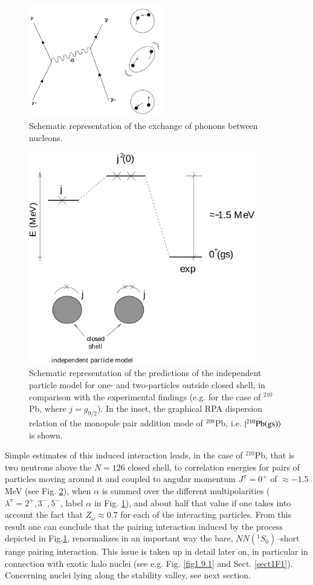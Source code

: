 \begin{figure}
\centerline {
\includegraphics*[width=6cm]{introduccion/figs/figintroD9}
}
\caption{Schematic representation of the exchange of phonons between nucleons.}
\label{fig:4.9}
\end{figure}
\begin{figure}
\centerline {
\includegraphics*[width=10cm]{introduccion/figs/figintroD10}
}
\caption{Schematic representation of the predictions of the independent particle model for one- and two-particles outside closed shell, in comparison with the experimental findings (e.g. for the case of $^{210}$Pb, where $j=g_{9/2}$). In the inset, the graphical RPA dispersion relation of the monopole pair addition mode of $^{208}$Pb, i.e. $|{^{210}\text{Pb(gs)}} \rangle$ is shown.}
\label{fig:4.10}
\end{figure}
Simple estimates of this induced interaction leads, in the case of $^{210}$Pb, that is two neutrons above the $N=126$ closed shell, to correlation energies  for pairs of particles moving around it and coupled to angular momentum $J^{\pi} = 0^+$ of $\approx -1.5$ MeV (see Fig. \ref{fig:4.10}), when $\alpha$ is summed over  the different multipolarities  ($\lambda^{\pi}=2^+,3^-,5^-$, label $\alpha$ in Fig. \ref{fig:4.9}), and about half that value if one takes into account the fact that $Z_\omega\approx0.7$ for each of the interacting particles. From this result one can conclude that the pairing interaction induced by the process depicted in Fig.\ref{fig:4.9}, renormalizes in an important way the bare, $NN(^1S_0)$--short range pairing interaction. This issue is taken up in detail later on, in particular in connection with exotic halo nuclei (see e.g. Fig. \ref{fig1.9.1} and Sect. \ref{sect1F1}). Concerning nuclei lying along the stability valley, see next section.

